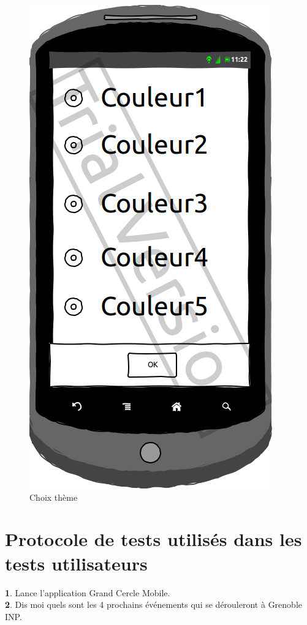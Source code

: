 \documentclass[a4paper, 11pt]{article}
\begin{document}
\begin{figure}[h!]
\begin{minipage}[c]{.32\linewidth}
\begin{center}
			\includegraphics[scale=0.3]{../../Sketch/Android/Design.png}
		\end{center}
	\caption{Choix thème}
	\end{minipage}
\end{figure}
\vfill
\clearpage

\section{Protocole de tests utilisés dans les tests utilisateurs}
\label{protocole}

\textbf{1}. Lance l’application Grand Cercle Mobile.	
\\

\textbf{2}. Dis moi quels sont les 4 prochains événements qui se dérouleront  à Grenoble INP.	
\\
\end{document}

